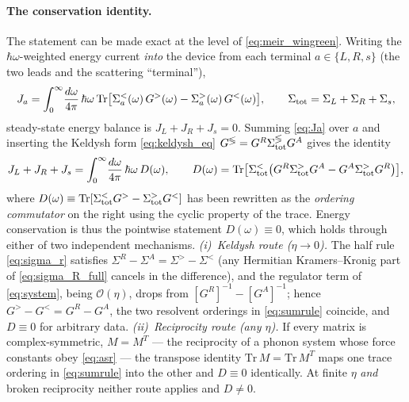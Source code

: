 \paragraph{The conservation identity.}
The statement can be made exact at the level of \cref{eq:meir_wingreen}.
Writing the $\hbar\omega$-weighted energy current \emph{into} the device from
each terminal $a\in\{L,R,s\}$ (the two leads and the scattering ``terminal''),
\begin{equation}\label{eq:Ja}
  J_a = \int_0^\infty\!\frac{d\omega}{4\pi}\,\hbar\omega\,
  \mathrm{Tr}\bigl[\Sigma_a^<(\omega)\,G^>(\omega) - \Sigma_a^>(\omega)\,G^<(\omega)\bigr],
  \qquad \Sigma_{\rm tot} = \Sigma_L + \Sigma_R + \Sigma_s,
\end{equation}
steady-state energy balance is $J_L+J_R+J_s=0$. Summing \cref{eq:Ja} over $a$
and inserting the Keldysh form \cref{eq:keldysh_eq}
$G^{\lessgtr}=G^R\Sigma_{\rm tot}^{\lessgtr}G^A$ gives the identity
\begin{equation}\label{eq:sumrule}
  J_L+J_R+J_s = \int_0^\infty\!\frac{d\omega}{4\pi}\,\hbar\omega\,D(\omega),
  \qquad
  D(\omega) = \mathrm{Tr}\bigl[\Sigma_{\rm tot}^<\bigl(
     G^R\Sigma_{\rm tot}^>G^A - G^A\Sigma_{\rm tot}^>G^R\bigr)\bigr],
\end{equation}
where $D(\omega)\equiv\mathrm{Tr}[\Sigma_{\rm tot}^<G^>-\Sigma_{\rm tot}^>G^<]$
has been rewritten as the \emph{ordering commutator} on the right using the
cyclic property of the trace. Energy conservation is thus the pointwise
statement $D(\omega)\equiv0$, which holds through either of two independent
mechanisms. \emph{(i)~Keldysh route ($\eta\to0$).} The half rule
\cref{eq:sigma_r} satisfies $\Sigma^R-\Sigma^A=\Sigma^>-\Sigma^<$ (any
Hermitian Kramers--Kronig part of \cref{eq:sigma_R_full} cancels in the
difference), and the regulator term of \cref{eq:system}, being
$\mathcal{O}(\eta)$, drops from $[G^R]^{-1}-[G^A]^{-1}$; hence
$G^>-G^<=G^R-G^A$, the two resolvent orderings in \cref{eq:sumrule} coincide,
and $D\equiv0$ for arbitrary data. \emph{(ii)~Reciprocity route (any $\eta$).}
If every matrix is complex-symmetric, $M=M^T$ --- the reciprocity of a phonon
system whose force constants obey \cref{eq:asr} --- the transpose identity
$\mathrm{Tr}\,M=\mathrm{Tr}\,M^T$ maps one trace ordering in \cref{eq:sumrule}
into the other and $D\equiv0$ identically. At finite $\eta$ \emph{and} broken
reciprocity neither route applies and $D\neq0$.

